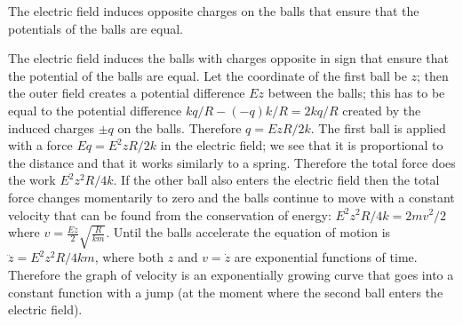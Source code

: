 {\ifEngHint
The electric field induces opposite charges on the balls that ensure that the potentials of the balls are equal.
\fi


\ifEngSolution
The electric field induces the balls with charges opposite in sign that ensure that the potential of the balls are equal. Let the coordinate of the first ball be $z$; then the outer field creates a potential difference $Ez$ between the balls; this has to be equal to the potential difference $kq/R-(-q)k/R=2kq/R$ created by the induced charges $\pm q$ on the balls. Therefore $q=EzR/2k$. The first ball is applied with a force $Eq=E^2zR/2k$ in the electric field; we see that it is proportional to the distance and that it works similarly to a spring. Therefore the total force does the work $E^2z^2R/4k$. If the other ball also enters the electric field then the total force changes momentarily to zero and the balls continue to move with a constant velocity that can be found from the conservation of energy: $E^2z^2R/4k=2mv^2/2$ where $v=\frac {Ez}{2}\sqrt{\frac{R}{km}}$. Until the balls accelerate the equation of motion is $\ddot z=E^2z^2R/4km$, where both $z$ and $v=\dot z$ are exponential functions of time. Therefore the graph of velocity is an exponentially growing curve that goes into a constant function with a jump (at the moment where the second ball enters the electric field).
\fi
}